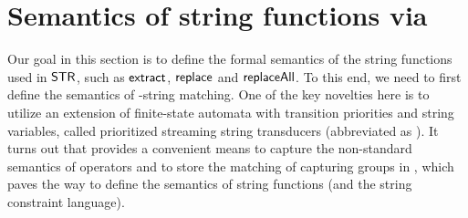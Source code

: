 \section{Semantics of string functions via {\PSST}}

Our goal in this section is to define the formal semantics of the string functions used in  $\mathsf{STR}$, such as $\mathsf{extract}$, $\mathsf{replace}$ and $\mathsf{replaceAll}$. To this end, we need to first define the semantics of {\regexp}-string matching. One of the key novelties here is to utilize an extension of finite-state automata with transition priorities and string variables, called prioritized streaming string transducers (abbreviated as \PSST). It turns out that {\PSST} provides a convenient means to capture the non-standard semantics of {\regexp} operators and to store the matching of capturing groups in {\regexp}, which paves the way to define the semantics of string functions (and the string constraint language). 



